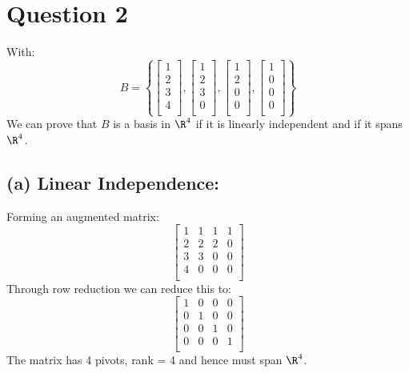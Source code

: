 \documentclass{article}
\begin{document}
\section{Question 2} 
With:
\[%
    B = 
    \left\{ 
    \begin{bmatrix}
        1 \\ 2 \\ 3 \\ 4 \\
    \end{bmatrix},
    \begin{bmatrix}
        1 \\ 2 \\ 3 \\ 0 \\
    \end{bmatrix},
    \begin{bmatrix}
        1 \\ 2 \\ 0 \\ 0 \\
    \end{bmatrix},
    \begin{bmatrix}
        1 \\ 0 \\ 0 \\ 0 \\
    \end{bmatrix}
    \right\}
\]%
We can prove that $B$ is a basis in $ \R^{4} $ if it is linearly independent and
if it spans $ \R^{4} $.

\subsection{(a) Linear Independence:} 
Forming an augmented matrix:
\[%
    \begin{bmatrix}
       1 & 1 & 1 & 1 \\
       2 & 2 & 2 & 0 \\
       3 & 3 & 0 & 0 \\
       4 & 0 & 0 & 0 \\
    \end{bmatrix}
\]%
Through row reduction we can reduce this to:
\[%
    \begin{bmatrix}
        1 & 0 & 0 & 0\\
        0 & 1 & 0 & 0\\
        0 & 0 & 1 & 0\\
        0 & 0 & 0 & 1\\		
    \end{bmatrix}
\]%
The matrix has 4 pivots, rank = 4 and hence must span $ \R^{4} $.
\end{document}

